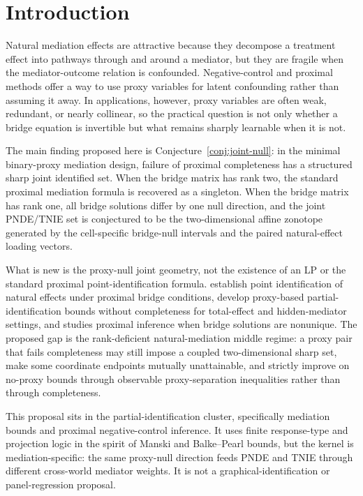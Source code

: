 \documentclass[11pt]{article}
\theoremstyle{definition}
\theoremstyle{plain}
\theoremstyle{remark}
\begin{document}
\section{Introduction}
Natural mediation effects are attractive because they decompose a treatment effect into pathways through and around a mediator, but they are fragile when the mediator-outcome relation is confounded.  Negative-control and proximal methods offer a way to use proxy variables for latent confounding rather than assuming it away.  In applications, however, proxy variables are often weak, redundant, or nearly collinear, so the practical question is not only whether a bridge equation is invertible but what remains sharply learnable when it is not.

The main finding proposed here is Conjecture~\ref{conj:joint-null}: in the minimal binary-proxy mediation design, failure of proximal completeness has a structured sharp joint identified set.  When the bridge matrix has rank two, the standard proximal mediation formula is recovered as a singleton.  When the bridge matrix has rank one, all bridge solutions differ by one null direction, and the joint PNDE/TNIE set is conjectured to be the two-dimensional affine zonotope generated by the cell-specific bridge-null intervals and the paired natural-effect loading vectors.

What is new is the proxy-null joint geometry, not the existence of an LP or the standard proximal point-identification formula.  \citet{DukesShpitserTchetgen2023} establish point identification of natural effects under proximal bridge conditions, \citet{GhassamiShpitserTchetgen2023} develop proxy-based partial-identification bounds without completeness for total-effect and hidden-mediator settings, and \citet{ZhangLiMiaoTchetgen2023} studies proximal inference when bridge solutions are nonunique.  The proposed gap is the rank-deficient natural-mediation middle regime: a proxy pair that fails completeness may still impose a coupled two-dimensional sharp set, make some coordinate endpoints mutually unattainable, and strictly improve on no-proxy bounds through observable proxy-separation inequalities rather than through completeness.

This proposal sits in the partial-identification cluster, specifically mediation bounds and proximal negative-control inference.  It uses finite response-type and projection logic in the spirit of Manski and Balke--Pearl bounds, but the kernel is mediation-specific: the same proxy-null direction feeds PNDE and TNIE through different cross-world mediator weights.  It is not a graphical-identification or panel-regression proposal.
\end{document}

